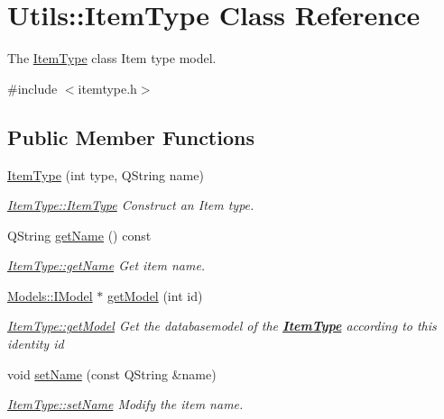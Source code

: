 \hypertarget{classUtils_1_1ItemType}{\section{Utils\-:\-:Item\-Type Class Reference}
\label{classUtils_1_1ItemType}
}


The \hyperlink{classUtils_1_1ItemType}{Item\-Type} class Item type model.  




{\ttfamily \#include $<$itemtype.\-h$>$}

\subsection*{Public Member Functions}
\begin{DoxyCompactItemize}
\item 
\hyperlink{classUtils_1_1ItemType_a5b06f6c289619f01ced33db7b16ab0f9}{Item\-Type} (int type, Q\-String name)
\begin{DoxyCompactList}\small\item\em \hyperlink{classUtils_1_1ItemType_a5b06f6c289619f01ced33db7b16ab0f9}{Item\-Type\-::\-Item\-Type} Construct an Item type. \end{DoxyCompactList}\item 
Q\-String \hyperlink{classUtils_1_1ItemType_a09fdb09837ad0ab678a271d3f97dd006}{get\-Name} () const 
\begin{DoxyCompactList}\small\item\em \hyperlink{classUtils_1_1ItemType_a09fdb09837ad0ab678a271d3f97dd006}{Item\-Type\-::get\-Name} Get item name. \end{DoxyCompactList}\item 
\hyperlink{classModels_1_1IModel}{Models\-::\-I\-Model} $\ast$ \hyperlink{classUtils_1_1ItemType_aff3b98516a4ee741cf926d9cd7cbd131}{get\-Model} (int id)
\begin{DoxyCompactList}\small\item\em \hyperlink{classUtils_1_1ItemType_aff3b98516a4ee741cf926d9cd7cbd131}{Item\-Type\-::get\-Model} Get the databasemodel of the {\bfseries \hyperlink{classUtils_1_1ItemType}{Item\-Type}} according to this identity {\itshape id} \end{DoxyCompactList}\item 
void \hyperlink{classUtils_1_1ItemType_aa993c315def3988851fc3af5f826c384}{set\-Name} (const Q\-String \&name)
\begin{DoxyCompactList}\small\item\em \hyperlink{classUtils_1_1ItemType_aa993c315def3988851fc3af5f826c384}{Item\-Type\-::set\-Name} Modify the item name. \end{DoxyCompactList}\item 

\end{DoxyCompactItemize}
